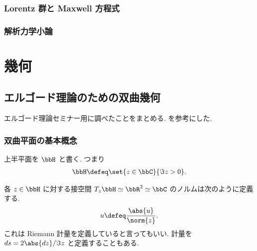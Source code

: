 \documentclass[openany, a4paper, oneside]{jsbook}
\begin{document}
\section{Lorentz 群と Maxwell 方程式}

\section{解析力学小論}

\part{幾何}

\chapter{エルゴード理論のための双曲幾何\label{introduction-to-hyperbolic-geometry4}}

エルゴード理論セミナー用に調べたことをまとめる.
\cite{YasuykiNakamura1, FranOiseDalbo1, RobertRhoades1} を参考にした.
\section{双曲平面の基本概念}

\begin{defn}
 上半平面を $\bbH$ と書く. つまり
 \begin{align}
  \bbH
  \defeq
  \set{z \in \bbC}{\Im z > 0}.
 \end{align}
\end{defn}
\begin{defn}
 各 $z \in \bbH$ に対する接空間 $T_z \bbH \simeq \bbR^2 \simeq \bbC$ のノルムは次のように定義する.
 \begin{align}
  u
  \defeq
  \frac{\abs{u}}{\norm{z}}.
 \end{align}
 これは Riemann 計量を定義していると言ってもいい.
 計量を $ds = 2 \abs{dz} / \Im z$ と定義することもある.
\end{defn}
\end{document}
